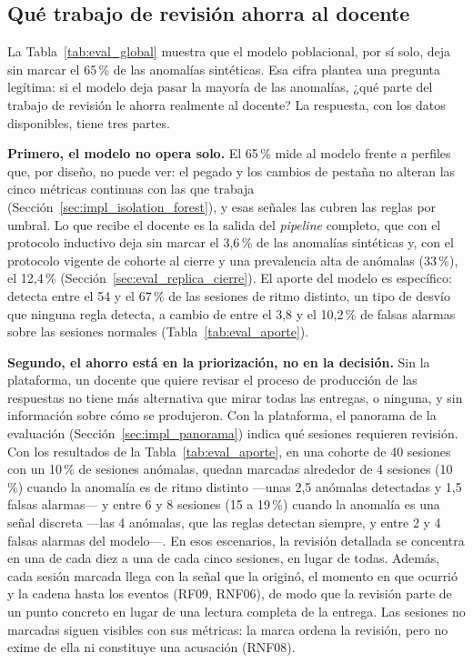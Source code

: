 \subsection{Qué trabajo de revisión ahorra al docente}
\label{sec:eval_ahorro_docente}

La Tabla~\ref{tab:eval_global} muestra que el modelo poblacional, por sí solo, deja sin marcar el 65\,\% de las anomalías sintéticas. Esa cifra plantea una pregunta legítima: si el modelo deja pasar la mayoría de las anomalías, ¿qué parte del trabajo de revisión le ahorra realmente al docente? La respuesta, con los datos disponibles, tiene tres partes.

\textbf{Primero, el modelo no opera solo.} El 65\,\% mide al modelo frente a perfiles que, por diseño, no puede ver: el pegado y los cambios de pestaña no alteran las cinco métricas continuas con las que trabaja (Sección~\ref{sec:impl_isolation_forest}), y esas señales las cubren las reglas por umbral. Lo que recibe el docente es la salida del \textit{pipeline} completo, que con el protocolo inductivo deja sin marcar el 3,6\,\% de las anomalías sintéticas y, con el protocolo vigente de cohorte al cierre y una prevalencia alta de anómalas (33\,\%), el 12,4\,\% (Sección~\ref{sec:eval_replica_cierre}). El aporte del modelo es específico: detecta entre el 54 y el 67\,\% de las sesiones de ritmo distinto, un tipo de desvío que ninguna regla detecta, a cambio de entre el 3,8 y el 10,2\,\% de falsas alarmas sobre las sesiones normales (Tabla~\ref{tab:eval_aporte}).

\textbf{Segundo, el ahorro está en la priorización, no en la decisión.} Sin la plataforma, un docente que quiere revisar el proceso de producción de las respuestas no tiene más alternativa que mirar todas las entregas, o ninguna, y sin información sobre cómo se produjeron. Con la plataforma, el panorama de la evaluación (Sección~\ref{sec:impl_panorama}) indica qué sesiones requieren revisión. Con los resultados de la Tabla~\ref{tab:eval_aporte}, en una cohorte de 40 sesiones con un 10\,\% de sesiones anómalas, quedan marcadas alrededor de 4 sesiones (10\,\%) cuando la anomalía es de ritmo distinto ---unas 2,5 anómalas detectadas y 1,5 falsas alarmas--- y entre 6 y 8 sesiones (15 a 19\,\%) cuando la anomalía es una señal discreta ---las 4 anómalas, que las reglas detectan siempre, y entre 2 y 4 falsas alarmas del modelo---. En esos escenarios, la revisión detallada se concentra en una de cada diez a una de cada cinco sesiones, en lugar de todas. Además, cada sesión marcada llega con la señal que la originó, el momento en que ocurrió y la cadena hasta los eventos (RF09, RNF06), de modo que la revisión parte de un punto concreto en lugar de una lectura completa de la entrega. Las sesiones no marcadas siguen visibles con sus métricas: la marca ordena la revisión, pero no exime de ella ni constituye una acusación (RNF08).

